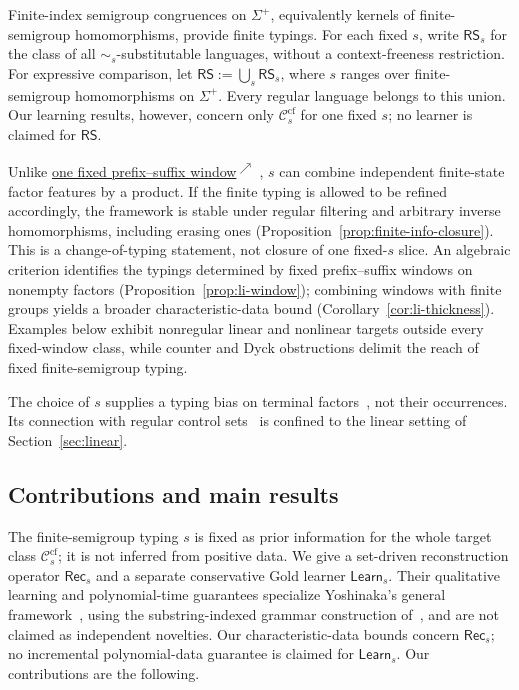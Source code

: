 \documentclass[11pt,a4paper]{article}
\newcommand{\fwdlink}[2]{%
  \hyperlink{#1}{#2\textsuperscript{\(\nearrow\)}}%
}
\theoremstyle{remark}
\theoremstyle{plain}
\newcommand{\cf}{\mathrm{cf}}
\newcommand{\Ccf}[1]{\mathcal C_{#1}^{\cf}}
\begin{document}
Finite-index semigroup congruences on $\Sigma^+$,
equivalently kernels of finite-semigroup homomorphisms,
provide finite typings.  For each fixed $s$,
write $\mathsf{RS}_s$ for the class of all $\sim_s$-substitutable
languages, without a context-freeness restriction.  For expressive
comparison, let
$\mathsf{RS}:=\bigcup_s\mathsf{RS}_s$,
where $s$ ranges over finite-semigroup homomorphisms on $\Sigma^+$.
Every regular language belongs to this union.  Our learning results,
however, concern only $\Ccf{s}$ for one fixed $s$; no learner is
claimed for $\mathsf{RS}$.

Unlike \fwdlink{def:kl-subst}{one fixed prefix--suffix window}, $s$ can combine independent
finite-state factor features by a product.  If the finite typing is allowed
to be refined accordingly, the framework is stable under regular filtering
and arbitrary inverse homomorphisms, including erasing ones
(Proposition~\ref{prop:finite-info-closure}).  This is a
change-of-typing statement, not closure of one fixed-$s$ slice.  An algebraic criterion identifies the typings determined by fixed
prefix--suffix windows on nonempty factors
(Proposition~\ref{prop:li-window}); combining windows with finite groups
yields a broader characteristic-data bound (Corollary~\ref{cor:li-thickness}).
Examples below exhibit nonregular linear and nonlinear targets
outside every fixed-window class, while counter and Dyck obstructions
delimit the reach of fixed finite-semigroup typing.

The choice of $s$ supplies a typing bias on terminal
factors~\cite{coste-typing2004}, not their occurrences.
Its connection with regular control
sets~\cite{takada1988,takada1995} is confined to
the linear setting of Section~\ref{sec:linear}.

\subsection{Contributions and main results}

The finite-semigroup typing $s$ is fixed as prior information
for the whole target class $\Ccf{s}$; it is not inferred
from positive data. We give a set-driven reconstruction operator
$\mathsf{Rec}_s$ and a separate conservative Gold learner
$\mathsf{Learn}_s$. Their qualitative learning and
polynomial-time guarantees specialize Yoshinaka's general
framework~\cite{yoshinaka2015}, using the substring-indexed
grammar construction of~\cite{yoshinaka2008}, and are not
claimed as independent novelties. Our characteristic-data
bounds concern $\mathsf{Rec}_s$; no incremental
polynomial-data guarantee is claimed for $\mathsf{Learn}_s$.
Our contributions are the following.
\end{document}
